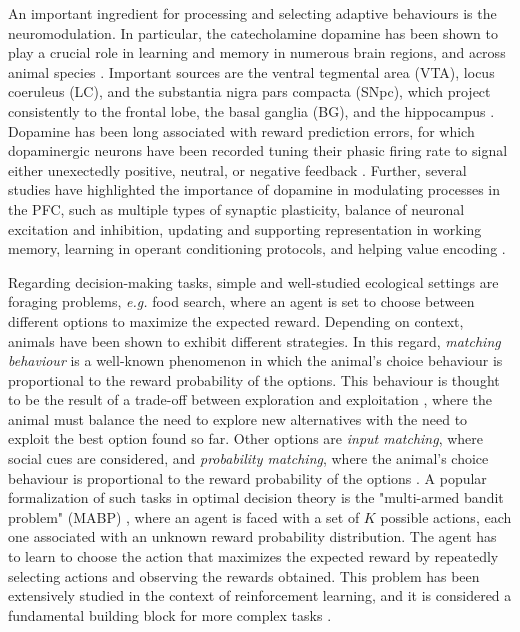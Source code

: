 An important ingredient for processing and selecting adaptive behaviours is the neuromodulation. In particular, the catecholamine dopamine has been shown to play a crucial role in learning and memory in numerous brain regions, and across animal species \cite{puigDopamineModulationLearning2014, duszkiewiczNoveltyDopaminergicModulation2019}.
Important sources are the ventral tegmental area (VTA), locus coeruleus (LC), and the substantia nigra pars compacta (SNpc), which project consistently to the frontal lobe, the basal ganglia (BG), and the hippocampus \cite{gotoPrefrontalCorticalSynaptic2007, coolsChemistryAdaptiveMind2019, reynoldsDopaminedependentPlasticityCorticostriatal2002}.
Dopamine has been long associated with reward prediction errors, for which dopaminergic neurons have been recorded tuning their phasic firing rate to signal either unexectedly positive, neutral, or negative feedback \cite{toblerAdaptiveCodingReward2005, schultzNeuralSubstratePrediction1997}.
Further, several studies have highlighted the importance of dopamine in modulating processes in the PFC, such as multiple types of synaptic plasticity, balance of neuronal excitation and inhibition, updating and supporting representation in working memory, learning in operant conditioning protocols,
and helping value encoding \cite{sheynikhovichLongtermMemorySynaptic2023, didomenicoDopaminergicModulationPrefrontal2023, lohaniDopamineModulationPrefrontal2019, dardenneRolePrefrontalCortex2012,
roeschDopamineNeuronsEncode2007}.

Regarding decision-making tasks, simple and well-studied ecological settings are foraging problems, \textit{e.g.} food search, where an agent is set to choose between different options to maximize the expected reward.
Depending on context, animals have been shown to exhibit different strategies.
In this regard, \textit{matching behaviour} is a well-known phenomenon in which the animal's choice behaviour is proportional to the reward probability of the options.
This behaviour is thought to be the result of a trade-off between exploration and exploitation \cite{suttonReinforcementLearningProblem1998, nivEvolutionReinforcementLearning2002}, where the animal must balance the need to explore new alternatives with the need to exploit the best option found so far.
Other options are \textit{input matching}, where social cues are considered, and \textit{probability matching}, where the animal's choice behaviour is proportional to the reward probability of the options
\cite{bariDynamicDecisionMaking2021, houstonMatchingBehavioursRewards2021}. A popular formalization of such tasks in optimal decision theory is the "multi-armed bandit problem" (MABP) \cite{averbeckTheoryChoiceBandit2015}, where an agent is faced with a set of $K$ possible actions, each one associated with an unknown reward probability distribution.
The agent has to learn to choose the action that maximizes the expected reward by repeatedly selecting actions and observing the rewards obtained.
This problem has been extensively studied in the context of reinforcement learning, and it is considered a fundamental building block for more complex tasks \cite{suttonReinforcementLearningProblem1998}.

